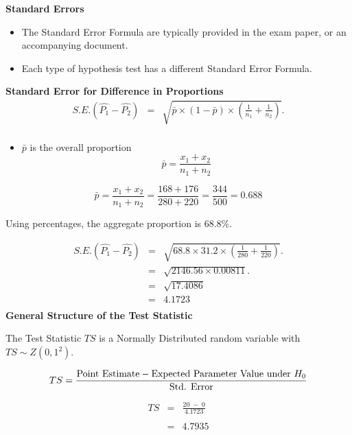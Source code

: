 \documentclass[a4paper,12pt]{article}
\begin{document}
\noindent \textbf{Standard Errors}
\begin{itemize}
    \item The Standard Error Formula are typically provided in the exam paper, or an accompanying document.
    \item Each type of hypothesis test has a different Standard Error Formula.
\end{itemize}
\bigskip
\begin{framed}
\noindent \textbf{Standard Error for Difference in Proportions}\\
\begin{eqnarray*}
	S.E.(\hat{P_1}-\hat{P_2})&=&\sqrt{ \bar{p}\times(1-\bar{p}) \times \left(\frac{1}{n_1}+\frac{1}{n_2}\right)}.\\
\end{eqnarray*}
\begin{itemize}
    \item $\bar{p}$ is the overall proportion
\[    \bar{p} = \frac{x_1 + x_2}{n_1+n_2}\]
\end{itemize}
\end{framed}

\[    \bar{p} = \frac{x_1 + x_2}{n_1+n_2} = \frac{168 + 176}{280+ 220} = \frac{344}{500} =0.688\]

\noindent Using percentages, the aggregate proportion is 68.8\%.

\begin{eqnarray*}
	S.E.(\hat{P_1}-\hat{P_2})&=&\sqrt{ 68.8 \times 31.2 \times \left(\frac{1}{280}+\frac{1}{220}\right)}.\\
	&=&\sqrt{ 2146.56 \times 0.00811}.\\
	&=&\sqrt{17.4086}\\
	&=& 4.1723 \\
\end{eqnarray*}
\noindent \textbf{General Structure of the Test Statistic}

\noindent The Test Statistic $TS$ is a Normally  Distributed random variable with $TS \sim Z(0,1^2)$.
\begin{framed}
\[ TS = {\mbox{Point Estimate} - \mbox{Expected Parameter Value under $H_{0}$} \over \mbox{Std. Error}}\]
\end{framed}


\begin{eqnarray*}
TS &=& \frac{ 20\;-\; 0}{4.1723} \\
& & \\
&=& 4.7935\\
\end{eqnarray*}
\newpage 
\end{document}
